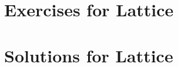 \documentclass[11pt]{report}
\theoremstyle{plain}
\theoremstyle{definition}
\begin{document}

\appendix
\chapter{Exercises for Lattice}


\chapter{Solutions for Lattice}

\end{document}
